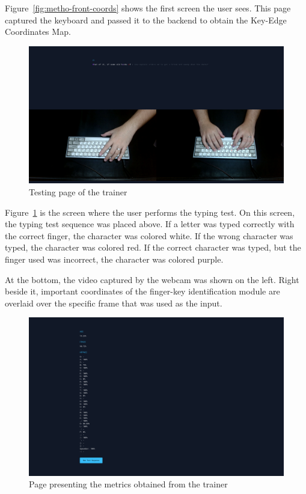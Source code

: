 \documentclass{report}
\begin{document}
Figure~\ref{fig:metho-front-coords} shows the first screen the user sees. This page
captured the keyboard and passed it to the backend to obtain the Key-Edge
Coordinates Map.

\begin{figure}[H]
	\centering
	\includegraphics[width=1\textwidth]{frontend-test.png}
	\caption{Testing page of the trainer}
	\label{fig:metho-front-test}
	\centering
\end{figure}

Figure~\ref{fig:metho-front-test} is the screen where the user performs the
typing test. On this screen, the typing test sequence was placed above. If a
letter was typed correctly with the correct finger, the character was colored
white. If the wrong character was typed, the character was colored red. If the
correct character was typed, but the finger used was incorrect, the character
was colored purple.

At the bottom, the video captured by the webcam was shown on the left. Right
beside it, important coordinates of the finger-key identification module are
overlaid over the specific frame that was used as the input.

\begin{figure}[H]
	\centering
	\includegraphics[width=1\textwidth]{frontend-metrics.png}
	\caption{Page presenting the metrics obtained from the trainer}
	\label{fig:metho-front-metrics}
	\centering
\end{figure}
\end{document}
